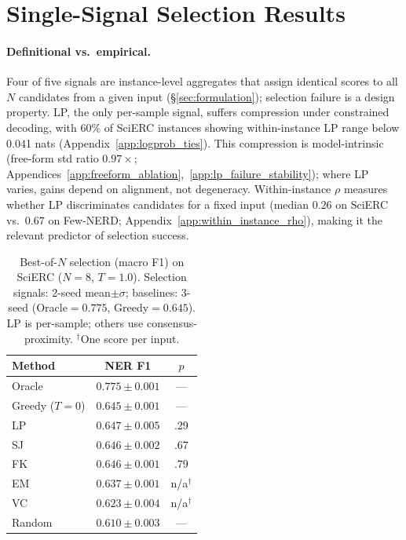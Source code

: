 \section{Single-Signal Selection Results}\label{sec:selection_gap}

\paragraph{Definitional vs.\ empirical.}
Four of five signals are instance-level aggregates that assign identical scores to all $N$ candidates from a given input (\S\ref{sec:formulation}); selection failure is a design property.
LP, the only per-sample signal, suffers compression under constrained decoding, with 60\% of SciERC instances showing within-instance LP range below 0.041 nats (Appendix~\ref{app:logprob_ties}). This compression is model-intrinsic (free-form std ratio $0.97{\times}$; Appendices~\ref{app:freeform_ablation},~\ref{app:lp_failure_stability}); where LP varies, gains depend on alignment, not degeneracy.
Within-instance $\rho$ measures whether LP discriminates candidates for a fixed input (median $0.26$ on SciERC vs.\ $0.67$ on Few-NERD; Appendix~\ref{app:within_instance_rho}), making it the relevant predictor of selection success.

\begin{table}[t]
\centering
\small
\caption{Best-of-$N$ selection (macro F1) on SciERC ($N{=}8$, $T{=}1.0$). Selection signals: 2-seed mean${\pm}\sigma$; baselines: 3-seed (Oracle${=}0.775$, Greedy${=}0.645$). LP is per-sample; others use consensus-proximity. $^\dagger$One score per input.}
\label{tab:selection}
\begin{tabular}{lcc}
\toprule
Method & NER F1 & $p$ \\
\midrule
Oracle & $0.775 \pm 0.001$ & --- \\
Greedy ($T{=}0$) & $0.645 \pm 0.001$ & --- \\
\midrule
LP           & $\mathbf{0.647} \pm 0.005$ & .29 \\
SJ           & $0.646 \pm 0.002$ & .67 \\
FK           & $0.646 \pm 0.001$ & .79 \\
EM           & $0.637 \pm 0.001$ & n/a$^\dagger$ \\
VC           & $0.623 \pm 0.004$ & n/a$^\dagger$ \\
\midrule
Random       & $0.610 \pm 0.003$ & --- \\
\bottomrule
\end{tabular}
\end{table}

